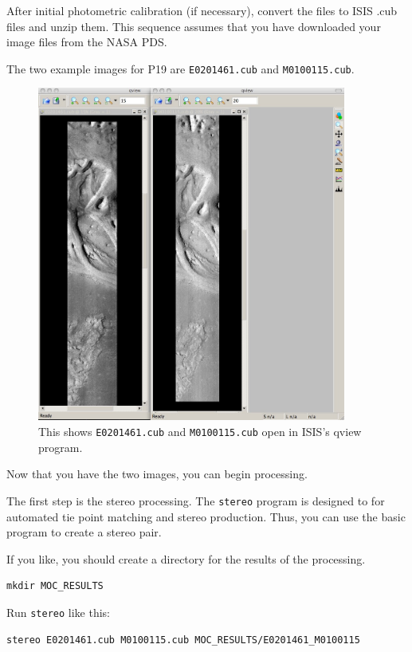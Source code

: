 After initial photometric calibration (if necessary), convert the
files to ISIS .cub files and unzip them. This sequence assumes that
you have downloaded your image files from the NASA PDS.

The two example images for P19 are \texttt{E0201461.cub} and 
\texttt{M0100115.cub}.

\begin{figure}
\begin{center}
\includegraphics[width=4in]{images/p19-images.png}
\caption[P19 images open in qview]{
    \label{p19-images}
    This shows \texttt{E0201461.cub} and \texttt{M0100115.cub} open in
	ISIS's qview program.
    }
\end{center}
\end{figure}

Now that you have the two images, you can begin processing. 

The first step is the stereo processing. The \texttt{stereo} program is
designed to for automated tie point matching and stereo production.
Thus, you can use the basic program to create a stereo pair.

If you like, you should create a directory for the results of the processing. 

\begin{verbatim}
mkdir MOC_RESULTS
\end{verbatim}

Run \texttt{stereo} like this:

\begin{verbatim}
stereo E0201461.cub M0100115.cub MOC_RESULTS/E0201461_M0100115
\end{verbatim}

